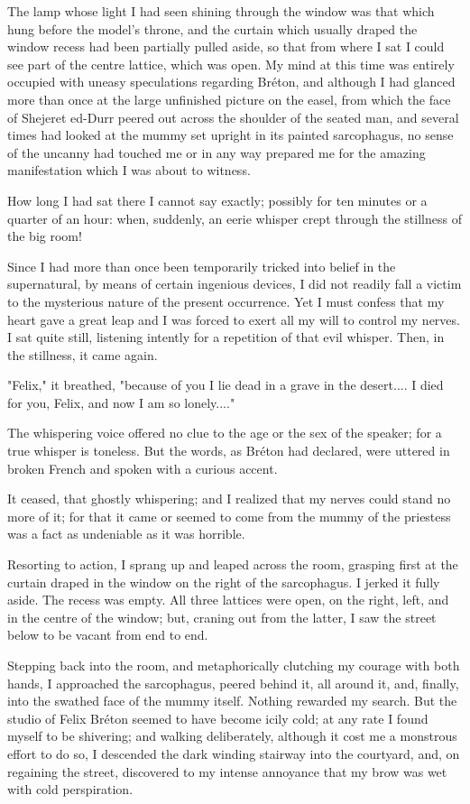 The lamp whose light I had seen shining through the window was that
which hung before the model's throne, and the curtain which usually
draped the window recess had been partially pulled aside, so that from
where I sat I could see part of the centre lattice, which was open.
My mind at this time was entirely occupied with uneasy speculations
regarding Bréton, and although I had glanced more than once at the
large unfinished picture on the easel, from which the face of Shejeret
ed-Durr peered out across the shoulder of the seated man, and several
times had looked at the mummy set upright in its painted sarcophagus,
no sense of the uncanny had touched me or in any way prepared me for
the amazing manifestation which I was about to witness.

How long I had sat there I cannot say exactly; possibly for ten
minutes or a quarter of an hour: when, suddenly, an eerie whisper
crept through the stillness of the big room!

Since I had more than once been temporarily tricked into belief in the
supernatural, by means of certain ingenious devices, I did not readily
fall a victim to the mysterious nature of the present occurrence. Yet
I must confess that my heart gave a great leap and I was forced to
exert all my will to control my nerves. I sat quite still, listening
intently for a repetition of that evil whisper. Then, in the
stillness, it came again.

"Felix," it breathed, "because of you I lie dead in a grave in the
desert.... I died for you, Felix, and now I am so lonely...."

The whispering voice offered no clue to the age or the sex of the
speaker; for a true whisper is toneless. But the words, as Bréton had
declared, were uttered in broken French and spoken with a curious
accent.

It ceased, that ghostly whispering; and I realized that my nerves
could stand no more of it; for that it came or seemed to come from the
mummy of the priestess was a fact as undeniable as it was horrible.

Resorting to action, I sprang up and leaped across the room, grasping
first at the curtain draped in the window on the right of the
sarcophagus. I jerked it fully aside. The recess was empty. All three
lattices were open, on the right, left, and in the centre of the
window; but, craning out from the latter, I saw the street below to
be vacant from end to end.

Stepping back into the room, and metaphorically clutching my courage
with both hands, I approached the sarcophagus, peered behind it, all
around it, and, finally, into the swathed face of the mummy itself.
Nothing rewarded my search. But the studio of Felix Bréton seemed to
have become icily cold; at any rate I found myself to be shivering;
and walking deliberately, although it cost me a monstrous effort to do
so, I descended the dark winding stairway into the courtyard, and, on
regaining the street, discovered to my intense annoyance that my brow
was wet with cold perspiration.

